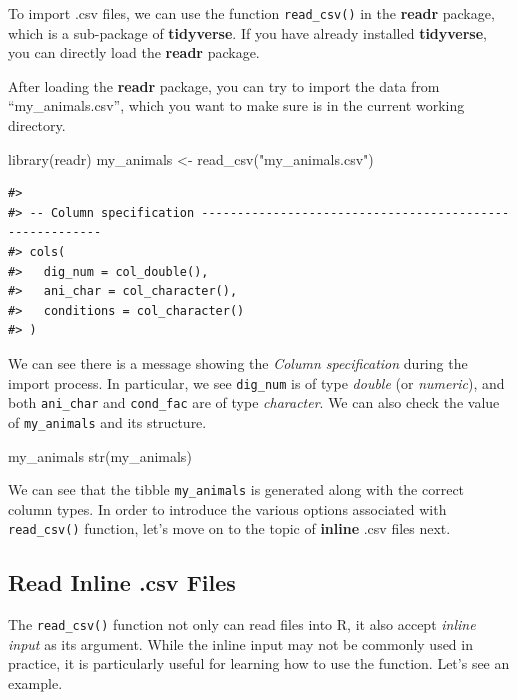 \documentclass[
]{book}
\newenvironment{Shaded}{\begin{snugshade}}{\end{snugshade}}
\newcommand{\FunctionTok}[1]{\textcolor[rgb]{0.00,0.00,0.00}{#1}}
\newcommand{\NormalTok}[1]{#1}
\newcommand{\OtherTok}[1]{\textcolor[rgb]{0.56,0.35,0.01}{#1}}
\newcommand{\StringTok}[1]{\textcolor[rgb]{0.31,0.60,0.02}{#1}}
\begin{document}
To import .csv files, we can use the function \texttt{read\_csv()} in the \textbf{readr} package, which is a sub-package of \textbf{tidyverse}. If you have already installed \textbf{tidyverse}, you can directly load the \textbf{readr} package.

After loading the \textbf{readr} package, you can try to import the data from ``my\_animals.csv'', which you want to make sure is in the current working directory.

\begin{Shaded}
\begin{Highlighting}[]
\FunctionTok{library}\NormalTok{(readr)}
\NormalTok{my\_animals }\OtherTok{\textless{}{-}} \FunctionTok{read\_csv}\NormalTok{(}\StringTok{"my\_animals.csv"}\NormalTok{)}
\end{Highlighting}
\end{Shaded}

\begin{verbatim}
#> 
#> -- Column specification --------------------------------------------------------
#> cols(
#>   dig_num = col_double(),
#>   ani_char = col_character(),
#>   conditions = col_character()
#> )
\end{verbatim}

We can see there is a message showing the \emph{Column specification} during the import process. In particular, we see \texttt{dig\_num} is of type \emph{double} (or \emph{numeric}), and both \texttt{ani\_char} and \texttt{cond\_fac} are of type \emph{character}. We can also check the value of \texttt{my\_animals} and its structure.

\begin{Shaded}
\begin{Highlighting}[]
\NormalTok{my\_animals}
\FunctionTok{str}\NormalTok{(my\_animals)}
\end{Highlighting}
\end{Shaded}

We can see that the tibble \texttt{my\_animals} is generated along with the correct column types. In order to introduce the various options associated with \texttt{read\_csv()} function, let's move on to the topic of \textbf{inline} .csv files next.

\hypertarget{read-inline-.csv-files}{%
\subsection{Read Inline .csv Files}\label{read-inline-.csv-files}}

The \texttt{read\_csv()} function not only can read files into R, it also accept \emph{inline input} as its argument. While the inline input may not be commonly used in practice, it is particularly useful for learning how to use the function. Let's see an example.
\end{document}
